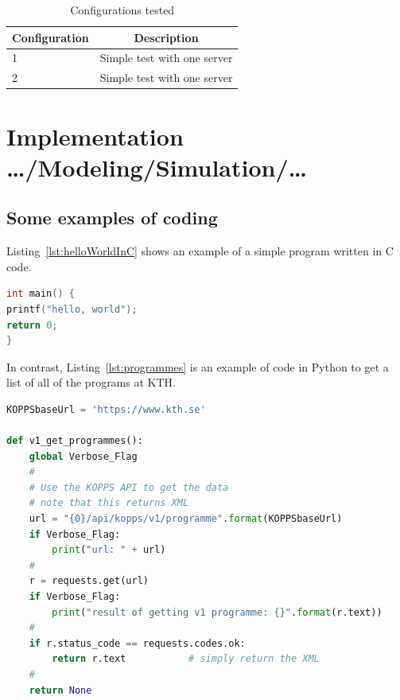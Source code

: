 \begin{table}[!ht]
  \begin{center}
    \caption{Configurations tested}
    \label{tab:configstested}
    \begin{tabular}{l|c} %
      \textbf{Configuration} & \textbf{Description} \\
      \hline
      1 & Simple test with one server\\
      2 & Simple test with one server\\
    \end{tabular}
  \end{center}
\end{table}

\section{Implementation …/Modeling/Simulation/…}
\label{sec:implementationDetails}

\subsection{Some examples of coding}

Listing~\ref{lst:helloWorldInC} shows an example of a simple program written
in C code.

\begin{lstlisting}[language={C}, caption={Hello world in C code}, label=lst:helloWorldInC]
int main() {
printf("hello, world");
return 0;
}
\end{lstlisting}


In contrast, Listing~\ref{lst:programmes} is an example of code in Python to
get a list of all of the programs at KTH.

\lstset{extendedchars=true}
\begin{lstlisting}[language={Python}, caption={Using a python program to
    access the KTH API to get all of the programs at KTH}, label=lst:programmes]
KOPPSbaseUrl = 'https://www.kth.se'

def v1_get_programmes():
    global Verbose_Flag
    #
    # Use the KOPPS API to get the data
    # note that this returns XML
    url = "{0}/api/kopps/v1/programme".format(KOPPSbaseUrl)
    if Verbose_Flag:
        print("url: " + url)
    #
    r = requests.get(url)
    if Verbose_Flag:
        print("result of getting v1 programme: {}".format(r.text))
    #
    if r.status_code == requests.codes.ok:
        return r.text           # simply return the XML
    #
    return None
\end{lstlisting}

